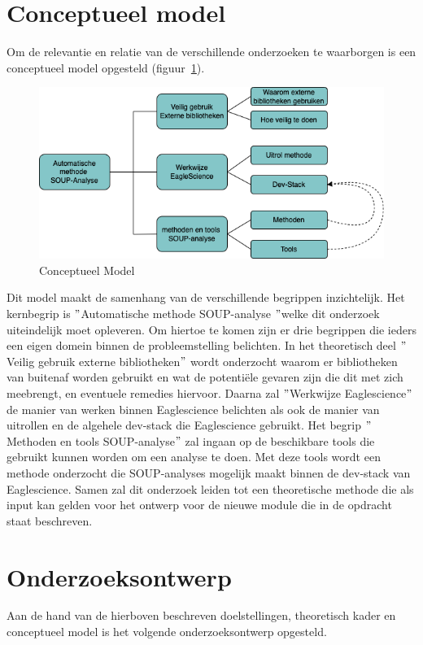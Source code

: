 \section{Conceptueel model}\label{sec:conceptueel-model}
Om de relevantie en relatie van de verschillende onderzoeken te waarborgen is een conceptueel model opgesteld (figuur~\ref{fig:ConceptueelModel}).
\begin{figure}
    \centering
    \includegraphics[width=12cm]{gfx/Conceptueel Model}
    \caption{Conceptueel Model}
    \label{fig:ConceptueelModel}
\end{figure}
Dit model maakt de samenhang van de verschillende begrippen inzichtelijk. Het kernbegrip is $"$Automatische methode SOUP-analyse $"$welke dit onderzoek uiteindelijk moet opleveren. Om hiertoe te komen zijn er drie begrippen die ieders een eigen domein binnen de probleemstelling belichten. In het theoretisch deel $"$Veilig gebruik externe bibliotheken$"$  wordt onderzocht waarom er bibliotheken van buitenaf worden gebruikt en wat de potentiële gevaren zijn die dit met zich meebrengt, en eventuele remedies hiervoor. Daarna zal $"$Werkwijze Eaglescience$"$ de manier van werken binnen Eaglescience belichten als ook de manier van uitrollen en de algehele dev-stack die Eaglescience gebruikt. Het begrip $"$Methoden en tools SOUP-analyse$"$ zal ingaan op de beschikbare tools die gebruikt kunnen worden om een analyse te doen. Met deze tools wordt een methode onderzocht die SOUP-analyses mogelijk maakt binnen de dev-stack van Eaglescience. Samen zal dit onderzoek leiden tot een theoretische methode die als input kan gelden voor het ontwerp voor de nieuwe module die in de opdracht staat beschreven.

\section{Onderzoeksontwerp}\label{sec:OP_onderzoeksontwerp}
Aan de hand van de hierboven beschreven doelstellingen, theoretisch kader en conceptueel model is het volgende onderzoeksontwerp opgesteld.

